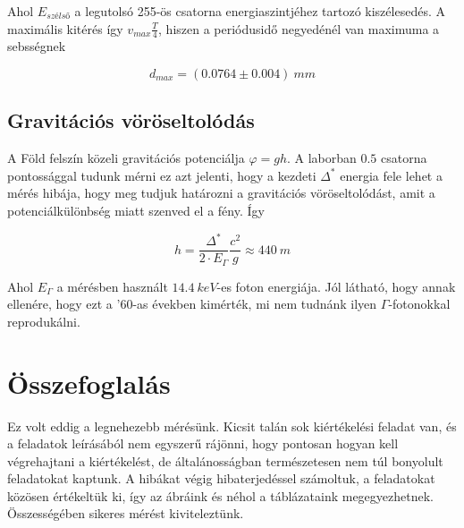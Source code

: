 \documentclass[a4paper,12pt]{article}
\begin{document}
\par Ahol $E_{szélső}$ a legutolsó 255-ös csatorna energiaszintjéhez tartozó kiszélesedés. A maximális kitérés így $v_{max}\frac{T}{4}$, hiszen a periódusidő negyedénél van maximuma a sebsségnek

\begin{equation*}
d_{max} = (0.0764 \pm 0.004) ~mm
\end{equation*}

\subsection{Gravitációs vöröseltolódás}

\par A Föld felszín közeli gravitációs potenciálja $\varphi = gh$. A laborban $0.5$ csatorna pontossággal tudunk mérni ez azt jelenti, hogy a kezdeti $\Delta^{*}$ energia fele lehet a mérés hibája, hogy meg tudjuk határozni a gravitációs vöröseltolódást, amit a potenciálkülönbség miatt szenved el a fény. Így

\begin{equation*}
h = \frac{\Delta^{*}}{2\cdot E_{\Gamma}}\frac{c^{2}}{g} \approx 440 ~m
\end{equation*}

\par Ahol $E_{\Gamma}$ a mérésben használt $14.4 ~keV$-es foton energiája. Jól látható, hogy annak ellenére, hogy ezt a '60-as években kimérték, mi nem tudnánk ilyen $\Gamma$-fotonokkal reprodukálni.

\section{Összefoglalás}

\par Ez volt eddig a legnehezebb mérésünk. Kicsit talán sok kiértékelési feladat van, és a feladatok leírásából nem egyszerű rájönni, hogy pontosan hogyan kell végrehajtani a kiértékelést, de általánosságban természetesen nem túl bonyolult feladatokat kaptunk. A hibákat végig hibaterjedéssel számoltuk, a feladatokat közösen értékeltük ki, így az ábráink és néhol a táblázataink megegyezhetnek. Összességében sikeres mérést kiviteleztünk.
\end{document}

